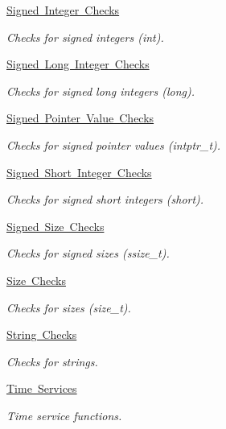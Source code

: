 \begin{DoxyCompactItemize}
\mbox{\hyperlink{group__RTEMSTestFrameworkChecksInt}{Signed Integer Checks}}
\begin{DoxyCompactList}\small\item\em Checks for signed integers (int). \end{DoxyCompactList}\item 
\mbox{\hyperlink{group__RTEMSTestFrameworkChecksLong}{Signed Long Integer Checks}}
\begin{DoxyCompactList}\small\item\em Checks for signed long integers (long). \end{DoxyCompactList}\item 
\mbox{\hyperlink{group__RTEMSTestFrameworkChecksIntptr}{Signed Pointer Value Checks}}
\begin{DoxyCompactList}\small\item\em Checks for signed pointer values (intptr\+\_\+t). \end{DoxyCompactList}\item 
\mbox{\hyperlink{group__RTEMSTestFrameworkChecksShort}{Signed Short Integer Checks}}
\begin{DoxyCompactList}\small\item\em Checks for signed short integers (short). \end{DoxyCompactList}\item 
\mbox{\hyperlink{group__RTEMSTestFrameworkChecksSSZ}{Signed Size Checks}}
\begin{DoxyCompactList}\small\item\em Checks for signed sizes (ssize\+\_\+t). \end{DoxyCompactList}\item 
\mbox{\hyperlink{group__RTEMSTestFrameworkChecksSZ}{Size Checks}}
\begin{DoxyCompactList}\small\item\em Checks for sizes (size\+\_\+t). \end{DoxyCompactList}\item 
\mbox{\hyperlink{group__RTEMSTestFrameworkChecksStr}{String Checks}}
\begin{DoxyCompactList}\small\item\em Checks for strings. \end{DoxyCompactList}\item 
\mbox{\hyperlink{group__RTEMSTestFrameworkTime}{Time Services}}
\begin{DoxyCompactList}\small\item\em Time service functions. \end{DoxyCompactList}\item 

\end{DoxyCompactItemize}
